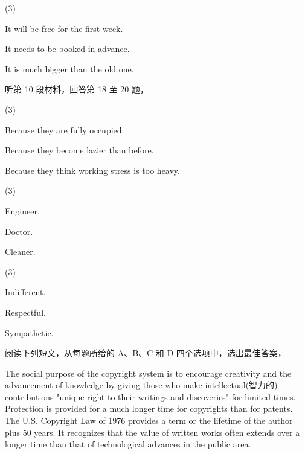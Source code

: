 \documentclass{英语试卷}
\begin{document}
\begin{choices}(3)
  \item It will be free for the first week.
  \item It needs to be booked in advance.
  \item It is much bigger than the old one.
\end{choices}
\par 听第 10 段材料，回答第 18 至 20 题，\par
{}
\begin{choices}(3)
  \item Because they are fully occupied.
  \item Because they become lazier than before.
  \item Because they think working stress is too heavy.
\end{choices}
\begin{choices}(3)
  \item Engineer.
  \item Doctor.
  \item Cleaner.
\end{choices}
\begin{choices}(3)
  \item Indifferent.
  \item Respectful.
  \item Sympathetic.
\end{choices}
\par 阅读下列短文，从每题所给的 A、B、C 和 D 四个选项中，选出最佳答案，\par
{}
\par The social purpose of the copyright system is to encourage creativity and the advancement of knowledge by giving those who make intellectual(智力的) contributions "unique right to their writings and discoveries" for limited times. Protection is provided for a much longer time for copyrights than for patents. The U.S. Copyright Law of 1976 provides a term or the lifetime of the author plus 50 years. It recognizes that the value of written works often extends over a longer time than that of technological advances in the public area.\par
\end{document}
